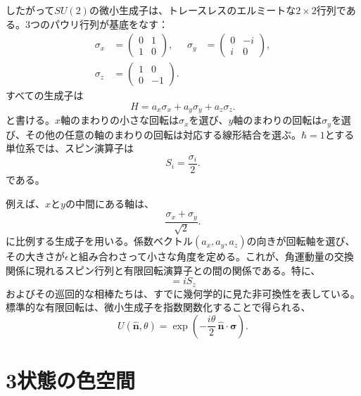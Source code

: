 したがって\(SU(2)\)の微小生成子は、トレースレスのエルミートな\(2\times2\)行列である。3つのパウリ行列が基底をなす：
\begin{equation}
\begin{aligned}
\sigma_x&=
\begin{pmatrix}0&1\\1&0\end{pmatrix},
&
\sigma_y&=
\begin{pmatrix}0&-i\\i&0\end{pmatrix},
\\[0.4em]
\sigma_z&=
\begin{pmatrix}1&0\\0&-1\end{pmatrix}.
\end{aligned}
\end{equation}
すべての生成子は
\begin{equation}
H=a_x\sigma_x+a_y\sigma_y+a_z\sigma_z.
\end{equation}
と書ける。\(x\)軸のまわりの小さな回転は\(\sigma_x\)を選び、\(y\)軸のまわりの回転は\(\sigma_y\)を選び、その他の任意の軸のまわりの回転は対応する線形結合を選ぶ。\(\hbar=1\)とする単位系では、スピン演算子は
\begin{equation}
S_i=\frac{\sigma_i}{2}.
\end{equation}
である。

例えば、\(x\)と\(y\)の中間にある軸は、
\begin{equation}
\frac{\sigma_x+\sigma_y}{\sqrt2}.
\end{equation}
に比例する生成子を用いる。係数ベクトル\((a_x,a_y,a_z)\)の向きが回転軸を選び、その大きさが\(\epsilon\)と組み合わさって小さな角度を定める。これが、角運動量の交換関係に現れるスピン行列と有限回転演算子との間の関係である。特に、
\begin{equation}
[S_x,S_y]=iS_z
\end{equation}
およびその巡回的な相棒たちは、すでに幾何学的に見た非可換性を表している。標準的な有限回転は、微小生成子を指数関数化することで得られる、
\begin{equation}
U(\hat{\boldsymbol n},\theta)
=\exp\left(-\frac{i\theta}{2}\,
\hat{\boldsymbol n}\cdot\boldsymbol\sigma\right).
\end{equation}
\section{3状態の色空間}

